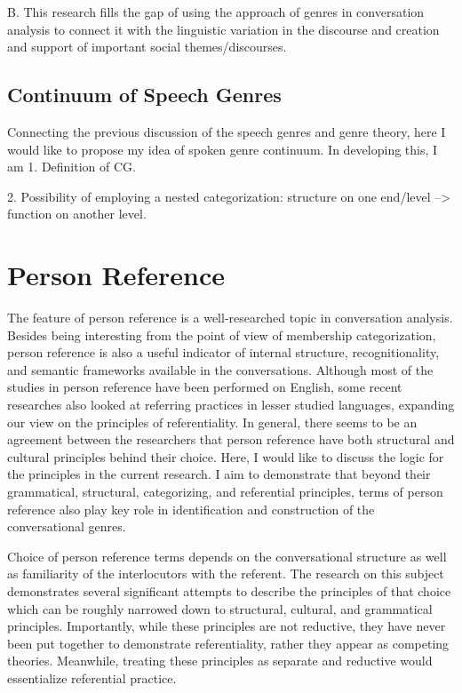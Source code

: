 \documentclass[12pt]{article}
\begin{document}
B.	This research fills the gap of using the approach of genres in conversation analysis to connect it with the linguistic variation in the discourse and creation and support of important social themes/discourses.


\subsection{Continuum of Speech Genres}
Connecting the previous discussion of the speech genres and genre theory, here I would like to propose my idea of spoken genre continuum. In developing this, I am 
1.	Definition of CG.

2.	Possibility of employing a nested categorization: structure on one end/level --> function on another level.
\section{Person Reference}
The feature of person reference is a well-researched topic in conversation analysis. Besides being interesting from the point of view of membership categorization, person reference is also a useful indicator of internal structure, recognitionality, and semantic frameworks available in the conversations. Although most of the studies in person reference have been performed on English, some recent researches also looked at referring practices in lesser studied languages, expanding our view on the principles of referentiality. In general, there seems to be an agreement between the researchers that person reference have both structural and cultural principles behind their choice. Here, I would like to discuss the logic for the principles in the current research. I aim to demonstrate that beyond their grammatical, structural, categorizing, and referential principles, terms of person reference also play key role in identification and construction of the conversational genres.

Choice of person reference terms depends on the conversational structure as well as familiarity of the interlocutors with the referent. The research on this subject demonstrates several significant attempts to describe the principles of that choice which can be roughly narrowed down to structural, cultural, and grammatical principles. Importantly, while these principles are not reductive, they have never been put together to demonstrate referentiality, rather they appear as competing theories. Meanwhile, treating these principles as separate and reductive would essentialize referential practice. 
\end{document}
